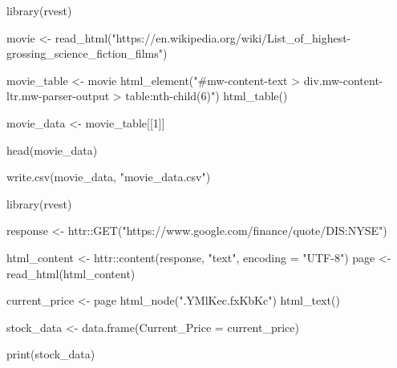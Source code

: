 library(rvest)

movie <- read_html("https://en.wikipedia.org/wiki/List_of_highest-grossing_science_fiction_films")

movie_table <- movie %
  html_element("#mw-content-text > div.mw-content-ltr.mw-parser-output > table:nth-child(6)") %
  html_table()


movie_data <- movie_table[[1]]

head(movie_data)

write.csv(movie_data, "movie_data.csv")




library(rvest)

response <- httr::GET("https://www.google.com/finance/quote/DIS:NYSE")

html_content <- httr::content(response, "text", encoding = "UTF-8")
page <- read_html(html_content)


current_price <- page %
  html_node(".YMlKec.fxKbKc") %
  html_text()

stock_data <- data.frame(Current_Price = current_price)

print(stock_data)
